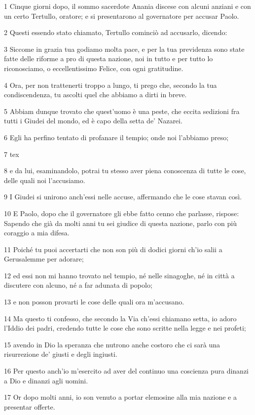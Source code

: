 \par 1 Cinque giorni dopo, il sommo sacerdote Anania discese con alcuni anziani e con un certo Tertullo, oratore; e si presentarono al governatore per accusar Paolo.
\par 2 Questi essendo stato chiamato, Tertullo cominciò ad accusarlo, dicendo:
\par 3 Siccome in grazia tua godiamo molta pace, e per la tua previdenza sono state fatte delle riforme a pro di questa nazione, noi in tutto e per tutto lo riconosciamo, o eccellentissimo Felice, con ogni gratitudine.
\par 4 Ora, per non trattenerti troppo a lungo, ti prego che, secondo la tua condiscendenza, tu ascolti quel che abbiamo a dirti in breve.
\par 5 Abbiam dunque trovato che quest'uomo è una peste, che eccita sedizioni fra tutti i Giudei del mondo, ed è capo della setta de' Nazarei.
\par 6 Egli ha perfino tentato di profanare il tempio; onde noi l'abbiamo preso;
\par 7 tex
\par 8 e da lui, esaminandolo, potrai tu stesso aver piena conoscenza di tutte le cose, delle quali noi l'accusiamo.
\par 9 I Giudei si unirono anch'essi nelle accuse, affermando che le cose stavan così.
\par 10 E Paolo, dopo che il governatore gli ebbe fatto cenno che parlasse, rispose: Sapendo che già da molti anni tu sei giudice di questa nazione, parlo con più coraggio a mia difesa.
\par 11 Poiché tu puoi accertarti che non son più di dodici giorni ch'io salii a Gerusalemme per adorare;
\par 12 ed essi non mi hanno trovato nel tempio, né nelle sinagoghe, né in città a discutere con alcuno, né a far adunata di popolo;
\par 13 e non posson provarti le cose delle quali ora m'accusano.
\par 14 Ma questo ti confesso, che secondo la Via ch'essi chiamano setta, io adoro l'Iddio dei padri, credendo tutte le cose che sono scritte nella legge e nei profeti;
\par 15 avendo in Dio la speranza che nutrono anche costoro che ci sarà una risurrezione de' giusti e degli ingiusti.
\par 16 Per questo anch'io m'esercito ad aver del continuo una coscienza pura dinanzi a Dio e dinanzi agli uomini.
\par 17 Or dopo molti anni, io son venuto a portar elemosine alla mia nazione e a presentar offerte.
